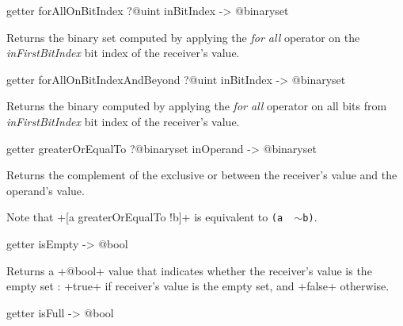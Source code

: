 \begin{galgas}
getter forAllOnBitIndex ?@uint inBitIndex -> @binaryset
\end{galgas}

Returns the binary set computed by applying the \emph{for all} operator on the \emph{inFirstBitIndex} bit index of the receiver's value.








\begin{galgas}
getter forAllOnBitIndexAndBeyond ?@uint inBitIndex -> @binaryset
\end{galgas}


Returns the binary computed by applying the \emph{for all} operator on all bits from \emph{inFirstBitIndex} bit index of the receiver's value.









\begin{galgas}
getter greaterOrEqualTo ?@binaryset inOperand -> @binaryset
\end{galgas}


Returns the complement of the exclusive or between the receiver's value and the operand's value.

Note that \ggs+[a greaterOrEqualTo !b]+ is equivalent to \texttt{(a \textbar ~$\sim$b)}.









\begin{galgas}
getter isEmpty -> @bool
\end{galgas}

Returns a \ggs+@bool+ value that indicates whether the receiver's value is the empty set :  \ggs+true+ if receiver's value is the empty set, and \ggs+false+ otherwise.








\begin{galgas}
getter isFull -> @bool
\end{galgas}

